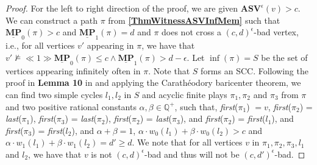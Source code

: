 \begin{proof}
For the left to right direction of the proof, we are given $\mathbf{ASV}^{\epsilon}(v) > c$. We can construct a path $\pi$ from \textbf{\cref{ThmWitnessASVInfMem}} such that $\underline{\mathbf{MP}}_0(\pi) > c$ and $\underline{\mathbf{MP}}_1(\pi) = d$ and $\pi$ does not cross a $(c,d)^{\epsilon}$-bad vertex, i.e., for all vertices $v'$ appearing in $\pi$, we have that $v' \nvDash \ll 1 \gg \underline{\mathbf{MP}}_0(\pi) \leqslant c \land \underline{\mathbf{MP}}_1(\pi) > d-\epsilon$. Let $\inf(\pi) = S$ be the set of vertices appearing infinitely often in $\pi$. Note that $S$ forms an SCC. 
Following the proof in \textbf{Lemma 10} in \cite{FGR20} and applying the Carathéodory baricenter theorem, we can find two simple cycles $l_1, l_2$ in $S$ and acyclic finite plays $\pi_1, \pi_2 $ and $\pi_3$ from $\pi$ and two positive rational constants $\alpha, \beta \in \mathbb{Q^+}$, such that, \textit{first}($\pi_1$) $ = v$, \textit{first}($\pi_2$) = \textit{last}($\pi_1$), \textit{first}($\pi_3$) = \textit{last}($\pi_2$), \textit{first}($\pi_2$) = \textit{last}($\pi_3$), and \textit{first}($\pi_2$) = \textit{first}($l_1$), and \textit{first}($\pi_3$) = \textit{first}($l_2$), and $\alpha + \beta = 1$, $\alpha \cdot w_0(l_1) + \beta \cdot w_0(l_2) > c$ and $\alpha \cdot w_1(l_1) + \beta \cdot w_1(l_2) = d' \geqslant d$. We note that for all vertices $v$ in $\pi_1, \pi_2, \pi_3, l_1$ and $l_2$, we have that $v$ is not $(c,d)^{\epsilon}$-bad and thus will not be $(c,d')^{\epsilon}$-bad.
\end{proof}